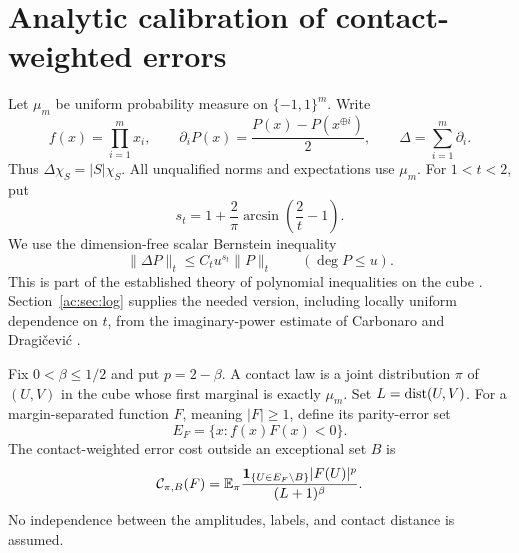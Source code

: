 \providecommand{\norm}[2]{\lVert #1\rVert_{#2}}
\section{Analytic calibration of contact-weighted errors}
Let $\mu_m$ be uniform probability measure on $\{-1,1\}^m$. Write
\[
 f(x)=\prod_{i=1}^m x_i,\qquad
 \partial_i P(x)=\frac{P(x)-P(x^{\oplus i})}{2},\qquad
 \Delta=\sum_{i=1}^m\partial_i.
\]
Thus $\Delta\chi_S=|S|\chi_S$. All unqualified norms and expectations use $\mu_m$. For $1<t<2$, put
\[
 s_t=1+\frac{2}{\pi}\arcsin\!\left(\frac2t-1\right).
\]
We use the dimension-free scalar Bernstein inequality
\begin{equation}\label{ac:eq:bernstein}
 \norm{\Delta P}{t}\le C_t u^{s_t}\norm{P}{t}
 \qquad (\deg P\le u).
\end{equation}
This is part of the established theory of polynomial inequalities on the cube \cite{EI}. Section~\ref{ac:sec:log} supplies the needed version, including locally uniform dependence on $t$, from the imaginary-power estimate of Carbonaro and Dragi\v cevi\'c \cite{CD}.

Fix $0<\beta\le1/2$ and put $p=2-\beta$. A contact law is a joint distribution $\pi$ of $(U,V)$ in the cube whose first marginal is exactly $\mu_m$. Set $L=\operatorname{dist}(U,V)$. For a margin-separated function $F$, meaning $|F|\ge1$, define its parity-error set
\[
 E_F=\{x:f(x)F(x)<0\}.
\]
The contact-weighted error cost outside an exceptional set $B$ is
\begin{equation}\label{ac:eq:cost}
 \mathcal C_{\pi,B}(F)
 =\mathbb E_\pi\frac{\mathbf 1_{\{U\in E_F\setminus B\}}|F(U)|^p}{(L+1)^\beta}.
\end{equation}
No independence between the amplitudes, labels, and contact distance is assumed.

